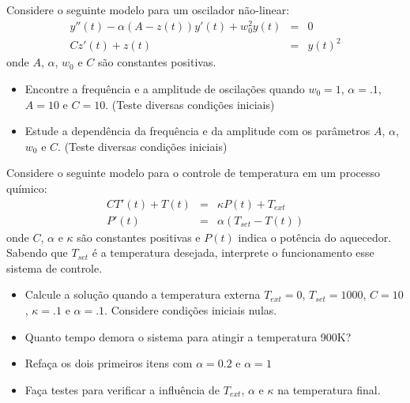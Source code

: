 \begin{Exercise} Considere o seguinte modelo para um oscilador não-linear:
\begin{eqnarray*}
y''(t)-\alpha(A-z(t))y'(t)+w_0^2 y(t)&=&0\\
Cz'(t)+z(t)&=&y(t)^2
\end{eqnarray*}
onde $A$, $\alpha$, $w_0$ e $C$ são constantes positivas.
\begin{itemize}
\item Encontre a frequência e a amplitude de oscilações quando $w_0=1$, $\alpha=.1$, $A=10$ e $C=10$. (Teste diversas condições iniciais)
\item Estude a dependência da frequência e da amplitude com os parâmetros  $A$, $\alpha$, $w_0$ e $C$. (Teste diversas condições iniciais)
\end{itemize}
\end{Exercise}

\begin{Exercise} Considere o seguinte modelo para o controle de temperatura em um processo químico:
\begin{eqnarray*}
CT'(t)+T(t)&=&\kappa P(t)+T_{ext}\\
P'(t)&=&\alpha(T_{set}-T(t))
\end{eqnarray*}
onde $C$, $\alpha$ e $\kappa$ são constantes positivas e $P(t)$ indica o potência do aquecedor. Sabendo que $T_{set}$ é a temperatura desejada, interprete o funcionamento esse sistema de controle.
\begin{itemize}
\item Calcule a solução quando a temperatura externa $T_{ext}=0$, $T_{set}=1000$, $C=10$, $\kappa=.1$ e $\alpha=.1$. Considere condições iniciais nulas.
\item Quanto tempo demora o sistema para atingir a temperatura 900K?
\item Refaça os dois primeiros itens com $\alpha=0.2$ e $\alpha=1$
\item Faça testes para verificar a influência de $T_{ext}$, $\alpha$ e $\kappa$ na temperatura final.
\end{itemize}
\end{Exercise}


